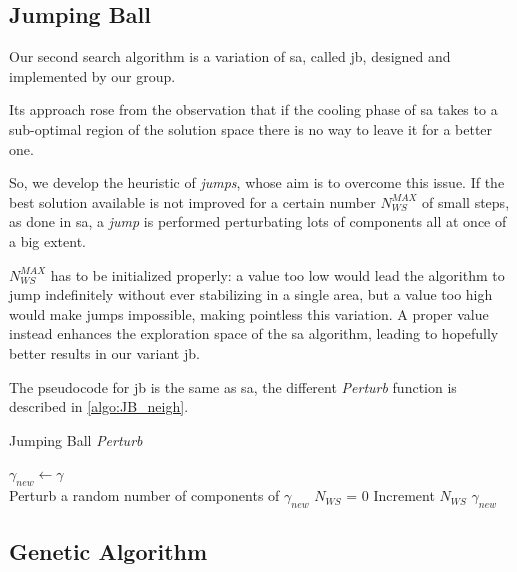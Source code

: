 \documentclass[12pt,journal,draftclsnofoot,onecolumn]{IEEEtran}
\begin{document}
\subsection{Jumping Ball}

Our second search algorithm is a variation of \gls{sa}, called \gls{jb}, designed and implemented by our group.

Its approach rose from the observation that if the cooling phase of \gls{sa} takes to a sub-optimal region of the solution space there is no way to leave it for a better one.

So, we develop the heuristic of \emph{jumps}, whose aim is to overcome this issue. If the best solution available is not improved for a certain number $N_{WS}^{MAX}$ of small steps, as done in \gls{sa}, a \emph{jump} is performed perturbating lots of components all at once of a big extent.

$N_{WS}^{MAX}$ has to be initialized properly: a value too low would lead the algorithm to jump indefinitely without ever stabilizing in a single area, but a value too high would make jumps impossible, making pointless this variation.
A proper value instead enhances the exploration space of the \gls{sa} algorithm, leading to hopefully better results in our variant \gls{jb}.

The pseudocode for \gls{jb} is the same as \gls{sa}, the different \emph{Perturb} function is described in \autoref{algo:JB_neigh}.

\begin{algorithm}
	\caption{Jumping Ball \emph{Perturb}}\label{algo:JB_neigh}
	 {
		$\gamma_{new} \gets \gamma$ \\
		 {
			 {
				Perturb a random number of components of $\gamma_{new}$
			}
			$N_{WS}$ = 0
		}
	}
	 {
		Increment $N_{WS}$
	}
	\Return $\gamma_{new}$
\end{algorithm}

\clearpage
\subsection{Genetic Algorithm}
\end{document}
